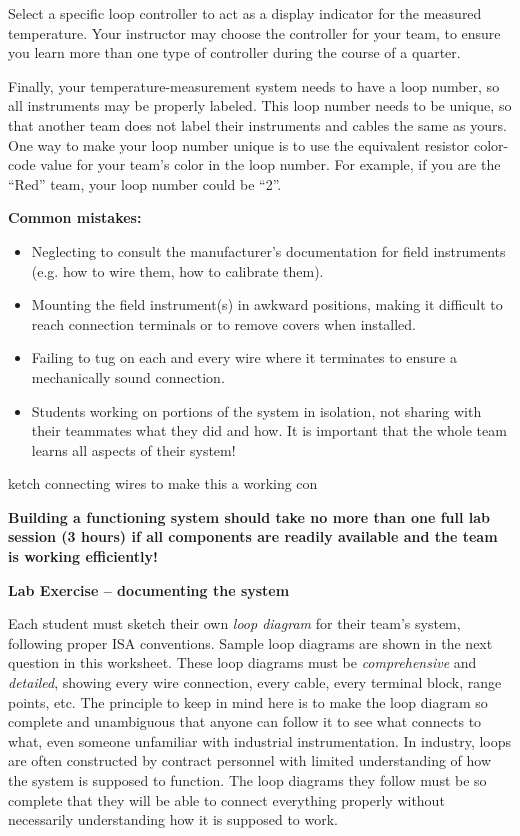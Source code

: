 Select a specific loop controller to act as a display indicator for the measured temperature.  Your instructor may choose the controller for your team, to ensure you learn more than one type of controller during the course of a quarter.

Finally, your temperature-measurement system needs to have a loop number, so all instruments may be properly labeled.  This loop number needs to be unique, so that another team does not label their instruments and cables the same as yours.  One way to make your loop number unique is to use the equivalent resistor color-code value for your team's color in the loop number.  For example, if you are the ``Red'' team, your loop number could be ``2''. 

\vskip 10pt

{\bf Common mistakes:}

\begin{itemize}
\item{} Neglecting to consult the manufacturer's documentation for field instruments (e.g. how to wire them, how to calibrate them).
\item{} Mounting the field instrument(s) in awkward positions, making it difficult to reach connection terminals or to remove covers when installed.
\item{} Failing to tug on each and every wire where it terminates to ensure a mechanically sound connection.
\item{} Students working on portions of the system in isolation, not sharing with their teammates what they did and how.  It is important that the whole team learns all aspects of their system!
\end{itemize}

ketch connecting wires to make this a working con

{\bf Building a functioning system should take no more than one full lab session (3 hours) if all components are readily available and the team is working efficiently!}




\vfil \eject

\noindent
{\bf Lab Exercise -- documenting the system}

\vskip 5pt

Each student must sketch their own {\it loop diagram} for their team's system, following proper ISA conventions.  Sample loop diagrams are shown in the next question in this worksheet.  These loop diagrams must be {\it comprehensive} and {\it detailed}, showing every wire connection, every cable, every terminal block, range points, etc.  The principle to keep in mind here is to make the loop diagram so complete and unambiguous that anyone can follow it to see what connects to what, even someone unfamiliar with industrial instrumentation.  In industry, loops are often constructed by contract personnel with limited understanding of how the system is supposed to function.  The loop diagrams they follow must be so complete that they will be able to connect everything properly without necessarily understanding how it is supposed to work.

